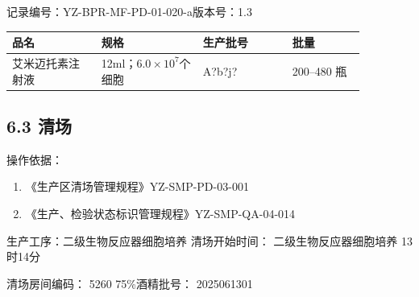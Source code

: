 \documentclass[UTF8,10pt,a4paper,fontset=fandol]{ctexart}
\newcommand{\fieldvalue}[1]{#1}
\newcommand{\handwritten}[1]{#1}
\begin{document}
记录编号：YZ-BPR-MF-PD-01-020-a\hfill 版本号：1.3

\begin{center}
\begin{tabular}{|p{0.22\linewidth}|p{0.25\linewidth}|p{0.22\linewidth}|p{0.18\linewidth}|}
\hline
品名 & 规格 & 生产批号 & 批量 \\
\hline
\fieldvalue{艾米迈托素注射液}
&
\fieldvalue{12ml；$6.0\times10^{7}$个细胞}
&
\fieldvalue{\handwritten{A?b?j?}}
&
\fieldvalue{200--480 瓶}
\\
\hline
\end{tabular}
\end{center}

\subsection*{6.3 清场}

操作依据：

\begin{enumerate}
\item 《生产区清场管理规程》\hfill YZ-SMP-PD-03-001
\item 《生产、检验状态标识管理规程》\hfill YZ-SMP-QA-04-014
\end{enumerate}

生产工序：二级生物反应器细胞培养\hfill
清场开始时间：
\fieldvalue{二级生物反应器细胞培养}
\hspace{1em}
\fieldvalue{\handwritten{13时14分}}

清场房间编码：
\fieldvalue{\handwritten{5260}}
\hfill
75\%酒精批号：
\fieldvalue{\handwritten{2025061301}}
\end{document}
